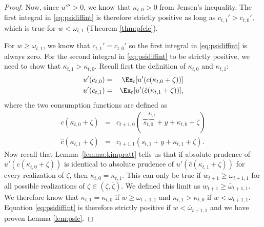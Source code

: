 \documentclass[titlepage]{\econtex}
\providecommand{\wAlt}{\omega}
\begin{document}
\begin{proof}
	Now, since $u'''>0$, we know that $\kappa_{t,0} > 0$ from Jensen's inequality. The first integral in \eqref{eq:psidiffint} is therefore strictly positive as long as $c_{t,1}' > c_{t,0}'$, which is true for ${w} < \wAlt_{t,1}$ (Theorem \ref{thm:pfclc}). 
	
	For ${w} \geq \wAlt_{t,1}$, we know that $c_{t,1}' = c_{t,0}'$ so the first integral in \eqref{eq:psidiffint} is always zero. For the second integral in \eqref{eq:psidiffint} to be strictly positive, we need to show that $\kappa_{t,1} > \kappa_{t,0}$. Recall first the definition of $\kappa_{t,0}$ and $\kappa_{t,1}$:
	\begin{eqnarray*}
		u'({c}_{t,0}) & = & \Ex_{t}[u'(c(\kappa_{t,0}+\zeta))]
		\\  u'({c}_{t,1}) & = & \Ex_{t}[u'(\hat{c}(\kappa_{t,1}+\zeta))],
	\end{eqnarray*}
	where the two consumption functions are defined as
	\begin{eqnarray}
	c(\kappa_{t,0}+\zeta) & = & c_{t+1,0}(\overbrace{{s}_{t,0}}^{={s}_{t,1}}+{y}+\kappa_{t,0}+\zeta) \label{eq:cnoconstr}
	\\  \hat{c}(\kappa_{t,1}+\zeta) & = & c_{t+1,1}({s}_{t,1}+{y}+\kappa_{t,1}+\zeta)\label{eq:gravecnoconstr}.
	\end{eqnarray}
	Now recall that Lemma~\ref{lemma:kimpratt} tells us that if absolute prudence of $u'(c(\kappa_{t,0}+\zeta))$ is identical to absolute prudence of $u'(\hat{c}(\kappa_{t,1}+\zeta))$ for every realization 	of $\zeta$, then $\kappa_{t,0}=\kappa_{t,1}$. This can only be true if $w_{t+1} \geq \wAlt_{t+1,1}$ for all possible realizations of $\zeta \in (\underline{\zeta}, \bar{\zeta})$. We defined this limit as $w_{t+1} \geq {\bar{\wAlt}}_{t+1,1}$. We therefore know that $\kappa_{t,1}  = \kappa_{t,0}$ if ${w} \geq {\bar{\wAlt}}_{t+1,1}$ and $\kappa_{t,1} > \kappa_{t,0}$ if ${w} < {\bar{\wAlt}}_{t+1,1}$. Equation \eqref{eq:psidiffint} is therefore strictly positive if ${w} < {\bar{\wAlt}}_{t+1,1}$ and we have proven Lemma \ref{lem:pslc}.
	
	
	
	


\end{proof}
\end{document}
